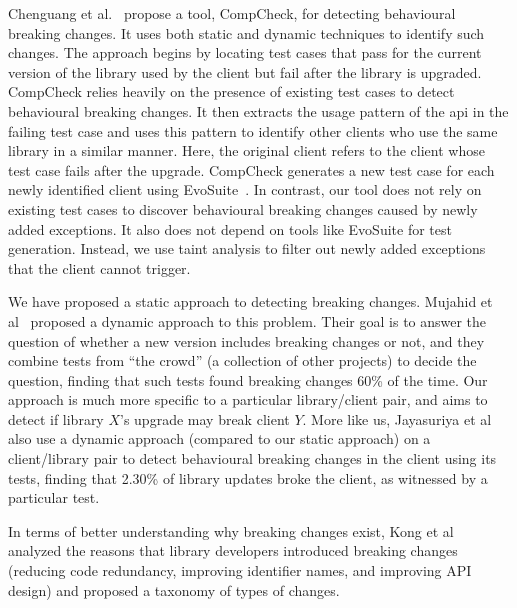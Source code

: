 Chenguang et al.~\cite{CompCheck} propose a tool, CompCheck, for detecting behavioural breaking changes. It uses both static and dynamic techniques to identify such changes. The approach begins by locating test cases that pass for the current version of the library used by the client but fail after the library is upgraded. CompCheck relies heavily on the presence of existing test cases to detect behavioural breaking changes. It then extracts the usage pattern of the \gls{api} in the failing test case and uses this pattern to identify other clients who use the same library in a similar manner. Here, the original client refers to the client whose test case fails after the upgrade. CompCheck generates a new test case for each newly identified client using EvoSuite~\cite{Gordon2011evosuite}. In contrast, our tool does not rely on existing test cases to discover behavioural breaking changes caused by newly added exceptions. It also does not depend on tools like EvoSuite for test generation. Instead, we use taint analysis to filter out newly added exceptions that the client cannot trigger.

We have proposed a static approach to detecting breaking changes. Mujahid et al~\cite{mujahid20:_using_other_tests_ident_break_updat} proposed a dynamic approach to this problem. Their goal is to answer the question of whether a new version includes breaking changes or not, and they combine tests from ``the crowd'' (a collection of other projects) to decide the question, finding that such tests found breaking changes 60\% of the time. Our approach is much more specific to a particular library/client pair, and aims to detect if library $X$'s upgrade may break client $Y$. More like us, Jayasuriya et al~\cite{jayasuriya24:_under_apis} also use a dynamic approach (compared to our static approach) on a client/library pair to detect behavioural breaking changes in the client using its tests, finding that 2.30\% of library updates broke the client, as witnessed by a particular test.

In terms of better understanding why breaking changes exist, Kong et al~\cite{kong25:_towar_better_compr_break_chang_npm_ecosy} analyzed the reasons that library developers introduced breaking changes (reducing code redundancy, improving identifier names, and improving API design) and proposed a taxonomy of types of changes.
